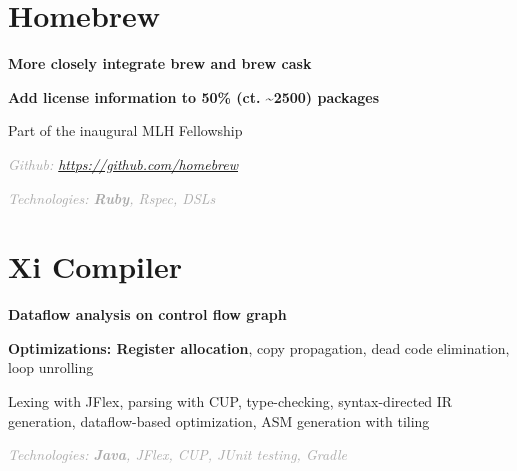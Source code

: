 \documentclass[]{deedy-resume-openfont}
\newcommand{\myurl}[1]{
	\urlstyle{same}\url{#1}
}
\let\sectionold\section
\renewcommand{\section}[1]{
	\sectionold{\textcolor{sectiontitlecolor}{#1}}
}
\begin{document}
\begin{minipage}[t]{0.66\textwidth} 



\section{Homebrew}
\vspace{\topsep} %
\begin{tightemize}
\item \textbf{More closely integrate brew and brew cask}
\item \textbf{Add license information to 50\% (ct. \textasciitilde 2500) packages}
\item Part of the inaugural MLH Fellowship
\item \textcolor{darkgray}{\textit{Github: \myurl{https://github.com/homebrew}}} \\
\item \textcolor{darkgray}{\textit{Technologies: \textbf{Ruby}, Rspec, DSLs}}
\end{tightemize}

\section{Xi Compiler}
\begin{tightemize}
\item \textbf{Dataflow analysis on control flow graph}
\item \textbf{Optimizations: Register allocation}, copy propagation, dead code elimination, loop unrolling
\item Lexing with JFlex, parsing with CUP, type-checking, syntax-directed IR generation, dataflow-based optimization, ASM generation with tiling
\item \textcolor{darkgray}{\textit{Technologies: \textbf{Java}, JFlex, CUP, JUnit testing, Gradle}} 
\end{tightemize}


\end{minipage}
\end{document}
